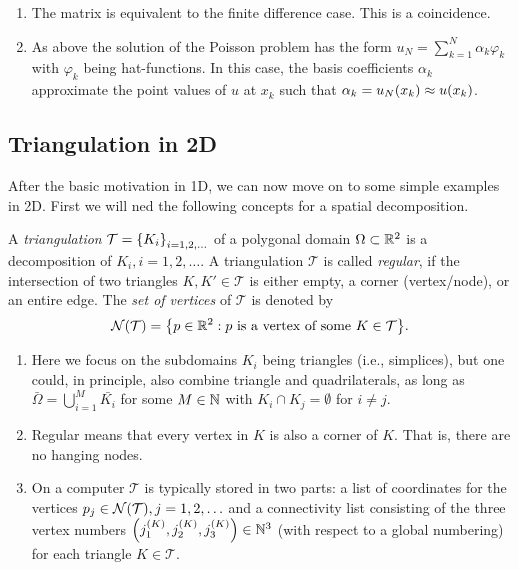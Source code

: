 \begin{remark}
    \begin{enumerate}
        \item The matrix is equivalent to the finite difference case.
        This is a coincidence.
        \item As above the solution of the Poisson problem has the form \(u_N = \sum_{k = 1}^N \alpha_k \varphi_k\) with \(\varphi_k\) being hat-functions.
        In this case, the basis coefficients \(\alpha_k\) approximate the point values of \(u\) at \(x_k\) such that \(\alpha_k = u_N\parentheses*{x_k} \approx u\parentheses*{x_k}\).
    \end{enumerate}
\end{remark}


\subsection{Triangulation in 2D}

After the basic motivation in 1D, we can now move on to some simple examples in 2D.
First we will ned the following concepts for a spatial decomposition.

\begin{definition}
    A \emph{triangulation} \(\mathcal{T} = \braces*{K_i}_{i = 1, 2, \ldots}\) of a polygonal domain \(\Omega \subset \R^2\) is a decomposition of \(K_i, i = 1, 2, \ldots\).
    A triangulation \(\mathcal{T}\) is called \emph{regular}, if the intersection of two triangles \(K, K' \in \mathcal{T}\) is either empty, a corner (vertex/node), or an entire edge.
    The \emph{set of vertices} of \(\mathcal{T}\) is denoted by
    \[
        \mathcal{N}\parentheses*{\mathcal{T}} = \braces*{p \in \R^2 : p\text{ is a vertex of some }K \in \mathcal{T}}.
    \]
\end{definition}

\begin{remark}
    \begin{enumerate}
        \item Here we focus on the subdomains \(K_i\) being triangles (i.e., simplices), but one could, in principle, also combine triangle and quadrilaterals, as long as \(\bar{\Omega} = \bigcup_{i = 1}^M \bar{K_i}\) for some \(M \in \N\) with \(K_i \cap K_j = \emptyset\) for \(i \ne j\).
        \item Regular means that every vertex in \(K\) is also a corner of \(K\).
        That is, there are no hanging nodes.
        \item On a computer \(\mathcal{T}\) is typically stored in two parts: a list of coordinates for the vertices \(p_j \in \mathcal{N}\parentheses*{\mathcal{T}}, j = 1, 2, \ldots\) and a connectivity list consisting of the three vertex numbers \(\parentheses*{j_1^{\parentheses*{K}}, j_2^{\parentheses*{K}}, j_3^{\parentheses*{K}}} \in \N^3\) (with respect to a global numbering) for each triangle \(K \in \mathcal{T}\).
    \end{enumerate}
\end{remark}

